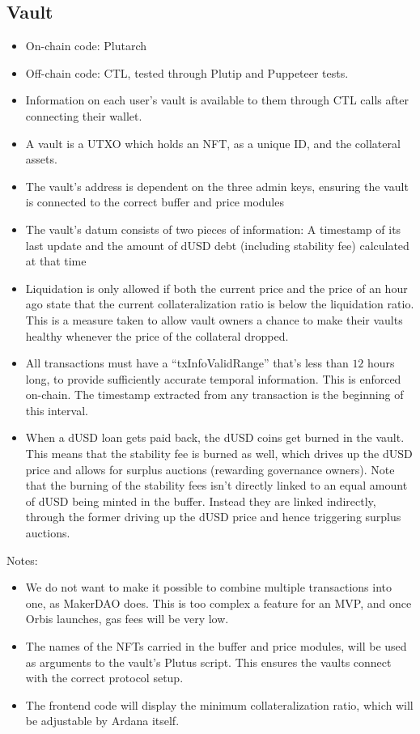 \documentclass{article} %
\begin{document}
\subsection{Vault}

\begin{itemize}
  \item On-chain code: Plutarch
  \item Off-chain code: CTL, tested through Plutip and Puppeteer tests.
  \item Information on each user's vault is available to them through CTL
    calls after connecting their wallet.
  \item A vault is a UTXO which holds an NFT, as a unique ID, and the collateral
    assets.
  \item The vault's address is dependent on the three admin keys, ensuring the
    vault is connected to the correct buffer and price modules
  \item The vault's datum consists of two pieces of information: A timestamp of
    its last update and the amount of dUSD debt (including stability fee)
    calculated at that time
  \item Liquidation is only allowed if both the current price and the price of
    an hour ago state that the current collateralization ratio is below the
    liquidation ratio.
    This is a measure taken to allow vault owners a chance to make their vaults
    healthy whenever the price of the collateral dropped.
  \item All transactions must have a ``txInfoValidRange'' that's less than $12$
    hours long, to provide sufficiently accurate temporal information. This is
    enforced on-chain. The timestamp extracted from any transaction is the
    beginning of this interval.
  \item When a dUSD loan gets paid back, the dUSD coins get burned in the vault.
    This means that the stability fee is burned as well, which drives up the
    dUSD price and allows for surplus auctions (rewarding governance owners).
    Note that the burning of the stability fees isn't directly linked to an
    equal amount of dUSD being minted in the buffer.
    Instead they are linked indirectly, through the former driving up the dUSD
    price and hence triggering surplus auctions.
\end{itemize}

Notes:
\begin{itemize}
  \item We do not want to make it possible to combine multiple transactions into
    one, as MakerDAO does.
    This is too complex a feature for an MVP, and once Orbis launches, gas fees
    will be very low.
  \item The names of the NFTs carried in the buffer and price modules, will be
    used as arguments to the vault's Plutus script.
    This ensures the vaults connect with the correct protocol setup.
  \item The frontend code will display the minimum collateralization ratio, which
    will be adjustable by Ardana itself.
\end{itemize}
\end{document}
